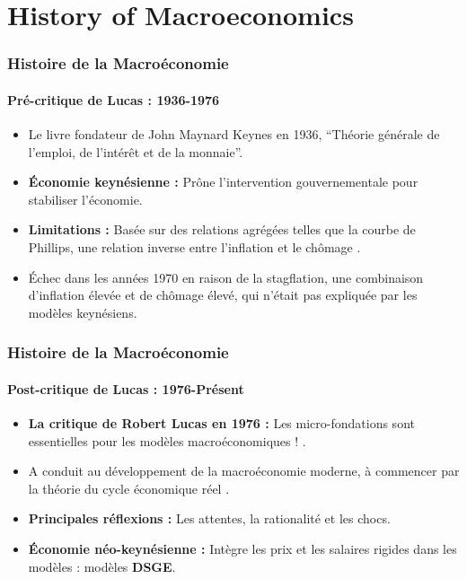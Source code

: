 \documentclass{beamer}
\begin{document}
\section{History of Macroeconomics}
\begin{frame}
    \frametitle{Histoire de la Macroéconomie}
    \framesubtitle{Pré-critique de Lucas : 1936-1976}
        \begin{itemize}
            \item Le livre fondateur de John Maynard Keynes en 1936, 
            \enquote{Théorie générale de l'emploi, de l'intérêt et de la monnaie}.
            \item \textbf{Économie keynésienne :} Prône l'intervention gouvernementale 
            pour stabiliser l'économie.
            \item \textbf{Limitations :} 
            Basée sur des relations agrégées telles que la courbe de Phillips,
            une relation inverse entre l'inflation et le chômage \parencite{Phillips_1958}.
            \item Échec dans les années 1970 en raison de la stagflation, une combinaison d'inflation élevée et de chômage élevé,
            qui n'était pas expliquée par les modèles keynésiens.
        \end{itemize}
    \end{frame}
    \begin{frame}
        \frametitle{Histoire de la Macroéconomie}
        \framesubtitle{Post-critique de Lucas : 1976-Présent}
                \begin{itemize}
                    \item \textbf{La critique de Robert Lucas en 1976 :} Les micro-fondations sont essentielles pour les modèles macroéconomiques ! \parencite{Lucas_1976}.
                    \item A conduit au développement de la macroéconomie moderne, à commencer par la théorie du cycle économique réel \textcite{Kydland_Prescott_1982}.
                    \item \textbf{Principales réflexions :} Les attentes, la rationalité et les chocs.
                    \item \textbf{Économie néo-keynésienne :} Intègre les prix et les salaires rigides dans les modèles : modèles \textbf{DSGE}.
                \end{itemize}
    \end{frame}
                        
\end{document}
